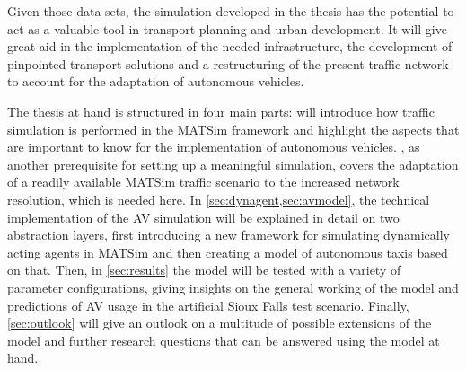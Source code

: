 Given those data sets, the simulation developed in the thesis has the potential
to act as a valuable tool in transport planning and urban development. It will give
great aid in the implementation of the needed infrastructure, the development of
pinpointed transport solutions and a restructuring of the present traffic network
to account for the adaptation of autonomous vehicles.

The thesis at hand is structured in four main parts:  will introduce how
traffic simulation is performed in the MATSim framework and highlight the aspects
that are important to know for the implementation of autonomous vehicles. ,
as another prerequisite for setting up a meaningful simulation, covers the adaptation
of a readily available MATSim traffic scenario to the increased network resolution,
which is needed here. In \cref{sec:dynagent,sec:avmodel}, the technical implementation
of the AV simulation will be explained in detail on two abstraction layers, first
introducing a new framework for simulating dynamically acting agents in MATSim
and then creating a model of autonomous taxis based on that. Then, in \cref{sec:results}
the model will be tested with a variety of parameter configurations, giving
insights on the general working of the model and predictions of AV usage in the
artificial Sioux Falls test scenario. Finally, \cref{sec:outlook} will give an outlook on
a multitude of possible extensions of the model and further research questions that
can be answered using the model at hand.
